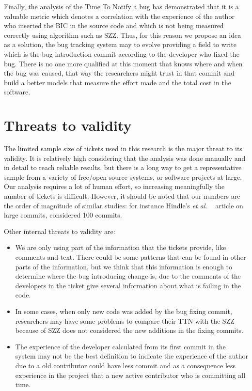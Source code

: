 \documentclass[10pt, conference]{IEEEtran}
\begin{document}
Finally, the analysis of the Time To Notify a bug has demonstrated that it is a valuable metric which denotes a correlation with the experience of the author who inserted the BIC in the source code and which is not being measured correctly using algorithm such as SZZ. Thus, for this reason we propose an idea as a solution, the bug tracking system may to evolve providing a field to write which is the bug introduction commit according to the developer who fixed the bug. There is no one more qualified at this moment that knows where and when the bug was caused, that way the researchers might trust in that commit and build a better models that measure the effort made and the total cost in the software.


\section{Threats to validity}
\label{sec:threats}
The limited sample size of tickets used in this research is the major threat to its validity. It is relatively high considering that the analysis was done manually and in detail to reach reliable results, but there is a long way to get a representative sample from a variety of free/open source systems, or software projects at large. Our analysis requires a lot of human effort, so increasing meaningfully the number of tickets is difficult. However, it should be noted that our numbers are the order of magnitude of similar studies: for instance Hindle's \emph{et al.} ~\cite{hindle2008large} article on large commits, considered 100 commits.

Other internal threats to validity are:

\begin{itemize}
    \item We are only using part of the information that the tickets provide, like comments and text. There could be some patterns that can be found in other parts of the information, but we think that this information is enough to determine where the bug introducing change is, due to the comments of the developers in the ticket give several information about what is failing in the code.
    \item In some cases, when only new code was added by the bug fixing commit, researchers may have some problems to compare their TTN with the SZZ because of SZZ does not considered the new additions in the fixing commits. 
    \item The experience of the developer calculated from its first commit in the system may not be the best definition to indicate the experience of the author due to a old contributor could have less commit and as a consequence less experience in the project that a new active contributor who is committing all time.
\end{itemize}
\end{document}
